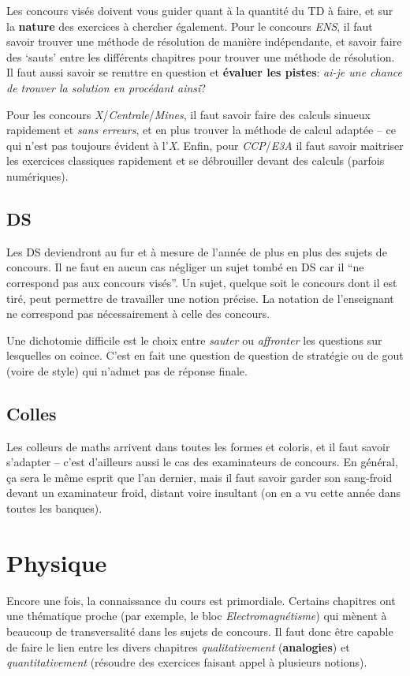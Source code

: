 \documentclass{article}
\begin{document}
Les concours visés doivent vous guider quant à la quantité du TD à faire, et sur la \textbf{nature} des exercices à chercher également.
Pour le concours \textit{ENS}, il faut savoir trouver une méthode de résolution de manière indépendante, et savoir faire des `sauts' entre les différents chapitres pour trouver une méthode de résolution.
Il faut aussi savoir se remttre en question et \textbf{évaluer les pistes}: \textit{ai-je une chance de trouver la solution en procédant ainsi}?

Pour les concours \textit{X}/\textit{Centrale}/\textit{Mines}, il faut savoir faire des calculs sinueux rapidement et \textit{sans erreurs}, et en plus trouver la méthode de calcul adaptée -- ce qui n'est pas toujours évident à l'\textit{X}.
Enfin, pour \textit{CCP}/\textit{E3A} il faut savoir maitriser les exercices classiques rapidement et se débrouiller devant des calculs (parfois numériques).

\subsection{DS}
Les DS deviendront au fur et à mesure de l'année de plus en plus des sujets de concours.
Il ne faut en aucun cas négliger un sujet tombé en DS car il ``ne correspond pas aux concours visés''.
Un sujet, quelque soit le concours dont il est tiré, peut permettre de travailler une notion précise.
La notation de l'enseignant ne correspond pas nécessairement à celle des concours.

Une dichotomie difficile est le choix entre \textit{sauter} ou \textit{affronter} les questions sur lesquelles on coince.
C'est en fait une question de question de stratégie ou de gout (voire de style) qui n'admet pas de réponse finale.

\subsection{Colles}
Les colleurs de maths arrivent dans toutes les formes et coloris, et il faut savoir s'adapter -- c'est d'ailleurs aussi le cas des examinateurs de concours.
En général, ça sera le même esprit que l'an dernier, mais il faut savoir garder son sang-froid devant un examinateur froid, distant voire insultant (on en a vu cette année dans toutes les banques).

\section{Physique}
Encore une fois, la connaissance du cours est primordiale.
Certains chapitres ont une thématique proche (par exemple, le bloc \textit{Electromagnétisme}) qui mènent à beaucoup de transversalité dans les sujets de concours.
Il faut donc être capable de faire le lien entre les divers chapitres \textit{qualitativement} (\textbf{analogies}) et \textit{quantitativement} (résoudre des exercices faisant appel à plusieurs notions).
\end{document}
